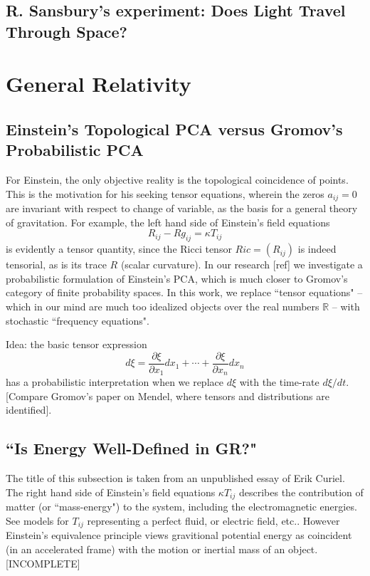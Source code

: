 \documentclass[12pt]{amsart}
\theoremstyle{definition}
\theoremstyle{remark}
\newcommand{\bR}{\mathbb{R}}
\begin{document}
\subsection{R. Sansbury's experiment: Does Light Travel Through Space?}
 
\section{General Relativity}


\subsection{Einstein's Topological PCA versus Gromov's Probabilistic PCA}
For Einstein, the only objective reality is the topological coincidence of points. This is the motivation for his seeking tensor equations, wherein the zeros $a_{ij}=0$ are invariant with respect to change of variable, as the basis for a general theory of gravitation. For example, the left hand side of Einstein's field equations $$R_{ij}-R g_{ij}=\kappa T_{ij}$$ is evidently a tensor quantity, since the Ricci tensor $Ric=(R_{ij})$ is indeed tensorial, as is its trace $R$ (scalar curvature). In our research [ref] we investigate a probabilistic formulation of Einstein's PCA, which is much closer to Gromov's category of finite probability spaces. In this work, we replace ``tensor equations" -- which in our mind are much too idealized objects over the real numbers $\bR$ --  with stochastic ``frequency equations". 

Idea: the basic tensor expression $$d\xi=\frac{\partial \xi}{\partial x_1} dx_1+\cdots + \frac{\partial \xi}{\partial x_n} dx_n$$ has a probabilistic interpretation when we replace $d\xi$ with the time-rate $d\xi/dt$. [Compare Gromov's paper on Mendel, where tensors and distributions are identified].

\subsection{``Is Energy Well-Defined in GR?"}
The title of this subsection is taken from an unpublished essay of Erik Curiel. The right hand side of Einstein's field equations $\kappa T_{ij}$ describes the contribution of matter (or ``mass-energy") to the system, including the electromagnetic energies. See models for $T_{ij}$ representing a perfect fluid, or electric field, etc.. However Einstein's equivalence principle views gravitional potential energy as coincident (in an accelerated frame) with the motion or inertial mass of an object. [INCOMPLETE]
\end{document}
